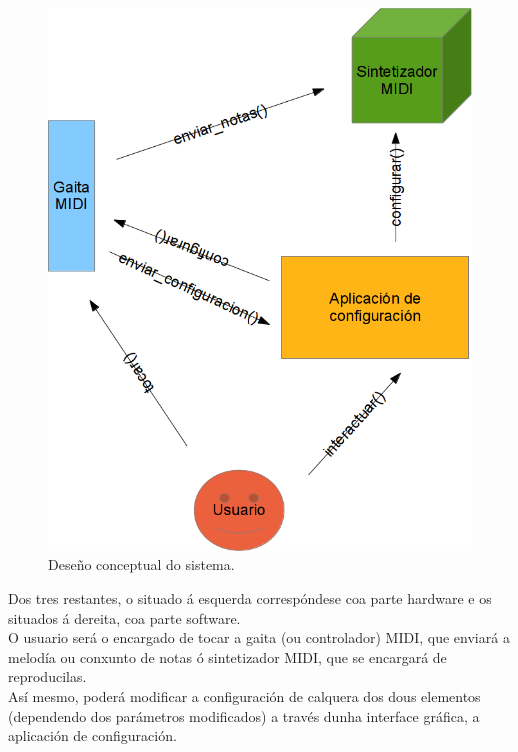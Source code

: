  \begin{figure}[htbp]
  \centering
  \includegraphics[scale=0.6,keepaspectratio=true]{./imagenes/concepto-operacion.png}
  \caption{Deseño conceptual do sistema.}
  \label{figura:DesenoConceptual}
 \end{figure}

 Dos tres restantes, o situado á esquerda correspóndese coa parte hardware e os
 situados á dereita, coa parte software. \\

 O usuario será o encargado de tocar a gaita (ou controlador) MIDI, que enviará
 a melodía ou conxunto de notas ó sintetizador MIDI, que se encargará de
 reproducilas. \\

 Así mesmo, poderá modificar a configuración de calquera dos dous elementos
 (dependendo dos parámetros modificados) a través dunha interface gráfica, a
 aplicación de configuración. \\

